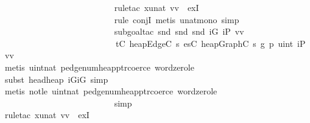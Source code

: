 \begin{isabellebody}
\ \ \ \ \ \ \ \ \ \ \ \ \ \ \ \ \ \ \ \ \ \ \ \ \ \isamarkupfalse%
\ {\isacharparenleft}rule{\isacharunderscore}tac\ x{\isacharequal}{\isachardoublequoteopen}unat\ vv{\isachardoublequoteclose}\ \ exI{\isacharparenright}\ \isanewline
\ \ \ \ \ \ \ \ \ \ \ \ \ \ \ \ \ \ \ \ \ \ \ \ \ \isamarkupfalse%
\ {\isacharparenleft}rule\ conjI{\isacharcomma}\ metis\ unat{\isacharunderscore}mono{\isacharcomma}\ simp{\isacharparenright}\isanewline
\ \ \ \ \ \ \ \ \ \ \ \ \ \ \ \ \ \ \ \ \ \ \ \ \ \isamarkupfalse%
\ {\isacharparenleft}subgoal{\isacharunderscore}tac\ {\isachardoublequoteopen}snd\ {\isacharparenleft}snd\ {\isacharparenleft}snd\ iG{\isacharparenright}\ {\isacharparenleft}iP\ vv{\isacharparenright}{\isacharparenright}\ {\isacharequal}\ \isanewline
\ \ \ \ \ \ \ \ \ \ \ \ \ \ \ \ \ \ \ \ \ \ \ \ \ \ \ t{\isacharunderscore}C\ {\isacharparenleft}heap{\isacharunderscore}Edge{\isacharunderscore}C\ s\ {\isacharparenleft}es{\isacharunderscore}C\ {\isacharparenleft}heap{\isacharunderscore}Graph{\isacharunderscore}C\ s\ g{\isacharparenright}\ {\isacharplus}\isactrlsub p\ uint\ {\isacharparenleft}iP\ vv{\isacharparenright}{\isacharparenright}{\isacharparenright}{\isachardoublequoteclose}{\isacharparenright}\isanewline
\ \ \ \ \ \ \ \ \ \ \ \ \ \ \ \ \ \ \ \ \ \ \ \ \ \ \isamarkupfalse%
\ {\isacharparenleft}metis\ uint{\isacharunderscore}nat\ pedge{\isacharunderscore}num{\isacharunderscore}heap{\isacharunderscore}ptr{\isacharunderscore}coerce\ word{\isacharunderscore}zero{\isacharunderscore}le{\isacharparenright}\isanewline
\ \ \ \ \ \ \ \ \ \ \ \ \ \ \ \ \ \ \ \ \ \ \ \ \ \isamarkupfalse%
\ {\isacharparenleft}subst\ head{\isacharunderscore}heap{\isacharbrackleft}\ iG{\isacharequal}iG{\isacharbrackright}{\isacharcomma}\ simp{\isacharparenright}\isanewline
\ \ \ \ \ \ \ \ \ \ \ \ \ \ \ \ \ \ \ \ \ \ \ \ \ \ \isamarkupfalse%
\ {\isacharparenleft}metis\ not{\isacharunderscore}le\ uint{\isacharunderscore}nat\ pedge{\isacharunderscore}num{\isacharunderscore}heap{\isacharunderscore}ptr{\isacharunderscore}coerce\ word{\isacharunderscore}zero{\isacharunderscore}le{\isacharparenright}\isanewline
\ \ \ \ \ \ \ \ \ \ \ \ \ \ \ \ \ \ \ \ \ \ \ \ \ \isamarkupfalse%
\ simp\isanewline
\ \ \ \ \ \ \ \ \ \ \ \ \ \ \ \ \ \ \ \ \ \ \ \ \isamarkupfalse%
\ {\isacharparenleft}rule{\isacharunderscore}tac\ x{\isacharequal}{\isachardoublequoteopen}unat\ vv{\isachardoublequoteclose}\ \ exI{\isacharparenright}\ \isanewline

\end{isabellebody}
